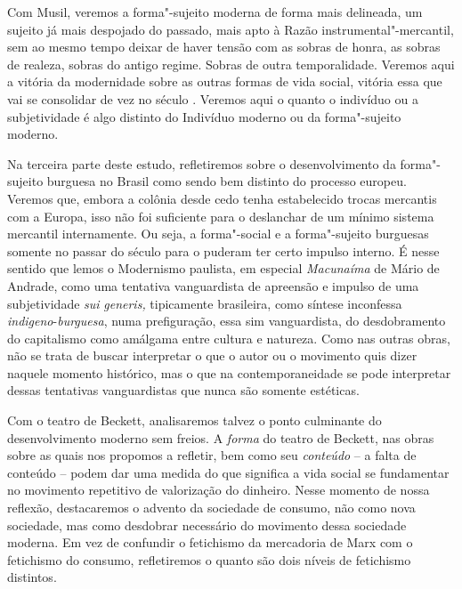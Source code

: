 Com Musil, veremos a forma"-sujeito moderna de forma mais delineada, um
sujeito já mais despojado do passado, mais apto à Razão
instrumental"-mercantil, sem ao mesmo tempo deixar de haver tensão com as
sobras de honra, as sobras de realeza, sobras do antigo regime. Sobras
de outra temporalidade. Veremos aqui a vitória da modernidade sobre as
outras formas de vida social, vitória essa que vai se consolidar de vez
no século . Veremos aqui o quanto o indivíduo ou a subjetividade é
algo distinto do Indivíduo moderno ou da forma"-sujeito moderno.

Na terceira parte deste estudo, refletiremos sobre o desenvolvimento da
forma"-sujeito burguesa no Brasil como sendo bem distinto do processo
europeu. Veremos que, embora a colônia desde cedo tenha estabelecido
trocas mercantis com a Europa, isso não foi suficiente para o deslanchar
de um mínimo sistema mercantil internamente. Ou seja, a forma"-social e a
forma"-sujeito burguesas somente no passar do século  para o 
puderam ter certo impulso interno. É nesse sentido que lemos o
Modernismo paulista, em especial \emph{Macunaíma} de Mário de Andrade,
como uma tentativa vanguardista de apreensão e impulso de uma
subjetividade \emph{sui} \emph{generis,} tipicamente brasileira, como
síntese inconfessa \emph{indigeno}-\emph{burguesa}, numa prefiguração,
essa sim vanguardista, do desdobramento do capitalismo como amálgama
entre cultura e natureza. Como nas outras obras, não se trata de buscar
interpretar o que o autor ou o movimento quis dizer naquele momento
histórico, mas o que na contemporaneidade se pode interpretar dessas
tentativas vanguardistas que nunca são somente estéticas.

Com o teatro de Beckett, analisaremos talvez o ponto culminante do
desenvolvimento moderno sem freios. A \emph{forma} do teatro de
Beckett, nas obras sobre as quais nos propomos a refletir, bem como seu
\emph{conteúdo} -- a falta de conteúdo -- podem dar uma medida do que
significa a vida social se fundamentar no movimento repetitivo de
valorização do dinheiro. Nesse momento de nossa reflexão, destacaremos o
advento da sociedade de consumo, não como nova sociedade, mas como
desdobrar necessário do movimento dessa sociedade moderna. Em vez de
confundir o fetichismo da mercadoria de Marx com o fetichismo do
consumo, refletiremos o quanto são dois níveis de fetichismo distintos.

